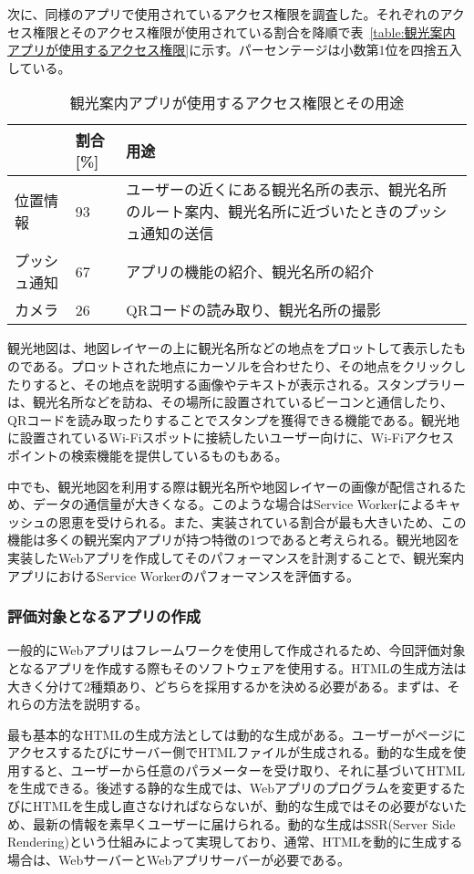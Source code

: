 次に、同様のアプリで使用されているアクセス権限を調査した。それぞれのアクセス権限とそのアクセス権限が使用されている割合を降順で表~\ref{table:観光案内アプリが使用するアクセス権限}に示す。パーセンテージは小数第1位を四捨五入している。

\begin{table}
  \caption{観光案内アプリが使用するアクセス権限とその用途}
  \label{table:観光案内アプリが使用するアクセス権限とその用途}
  \centering
  \begin{tabular}{|p{10em}|p{5em}|p{15em}|}
    \hline
    & 割合[\%] & 用途 \\ \hline
    位置情報 & 93 & ユーザーの近くにある観光名所の表示、観光名所のルート案内、観光名所に近づいたときのプッシュ通知の送信 \\ \hline
    プッシュ通知 & 67 & アプリの機能の紹介、観光名所の紹介 \\ \hline
    カメラ & 26 & QRコードの読み取り、観光名所の撮影 \\ \hline
  \end{tabular}
\end{table}
観光地図は、地図レイヤーの上に観光名所などの地点をプロットして表示したものである。プロットされた地点にカーソルを合わせたり、その地点をクリックしたりすると、その地点を説明する画像やテキストが表示される。スタンプラリーは、観光名所などを訪ね、その場所に設置されているビーコンと通信したり、QRコードを読み取ったりすることでスタンプを獲得できる機能である。観光地に設置されているWi-Fiスポットに接続したいユーザー向けに、Wi-Fiアクセスポイントの検索機能を提供しているものもある。

中でも、観光地図を利用する際は観光名所や地図レイヤーの画像が配信されるため、データの通信量が大きくなる。このような場合はService Workerによるキャッシュの恩恵を受けられる。また、実装されている割合が最も大きいため、この機能は多くの観光案内アプリが持つ特徴の1つであると考えられる。観光地図を実装したWebアプリを作成してそのパフォーマンスを計測することで、観光案内アプリにおけるService Workerのパフォーマンスを評価する。
\subsubsection{評価対象となるアプリの作成}
\label{subsubsection:評価対象となるアプリの作成}
一般的にWebアプリはフレームワークを使用して作成されるため、今回評価対象となるアプリを作成する際もそのソフトウェアを使用する。HTMLの生成方法は大きく分けて2種類あり、どちらを採用するかを決める必要がある。まずは、それらの方法を説明する。

最も基本的なHTMLの生成方法としては動的な生成がある。ユーザーがページにアクセスするたびにサーバー側でHTMLファイルが生成される。動的な生成を使用すると、ユーザーから任意のパラメーターを受け取り、それに基づいてHTMLを生成できる。後述する静的な生成では、Webアプリのプログラムを変更するたびにHTMLを生成し直さなければならないが、動的な生成ではその必要がないため、最新の情報を素早くユーザーに届けられる。動的な生成はSSR(Server Side Rendering)という仕組みによって実現しており、通常、HTMLを動的に生成する場合は、WebサーバーとWebアプリサーバーが必要である。

